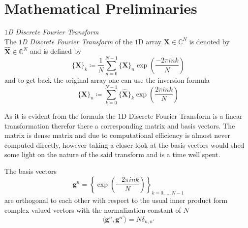 \chapter{Mathematical Preliminaries}






\begin{Def}\label{def:1ddft}
    \emph{$1$D Discrete Fourier Transform}\\
    The \emph{$1$D Discrete Fourier Transform} of the $1$D array $\boldsymbol{X} \in \mathbb{C}^{N}$ is denoted by 
    $\hat {\boldsymbol{X}} \in \mathbb{C}^{N}$ and is defined by
    \begin{equation}\label{eq:1ddft}
        \{\hat {\boldsymbol{X}}\}_{k} \coloneq \frac{1}{N}\sum_{n=0}^{N-1} \{{\boldsymbol{X}}\}_{n}\exp\left({\frac{-2\pi ink}{N}}\right)
    \end{equation}
    and to get back the original array one can use the inversion formula
    \begin{equation}\label{eq:1didft}
        \{{\boldsymbol{X}}\}_{n} \coloneq \sum_{k=0}^{N-1}\{\hat {\boldsymbol{X}}\}_{k}\exp\left({\frac{2\pi ink}{N}}\right)
    \end{equation}    
\end{Def}

As it is evident from the formula the $1$D Discrete Fourier Transform is a linear transformation therefor 
there a corresponding matrix and basis vectors. The matrix is dense matrix and due to computational efficiency 
is almost never computed directly, however taking a closer look at the basis vectors would shed some light on 
the nature of the said transform and is a time well spent.

\begin{Prop}\label{Prop:1ddftbasisvectors}
    The basis vectors
    \begin{equation}\label{eq:1ddftbasisvectors}
        \boldsymbol{g}^n = \left\{\exp\left({\frac{-2\pi ink}{N}}\right)\right\}_{k=0,\ldots,N-1}
    \end{equation}
    are orthogonal to each other with respect to the usual inner product form complex valued vectors 
    with the normalization constant of $N$
    \begin{equation}
        \langle\boldsymbol{g}^n,\boldsymbol{g}^{n'}\rangle= N \delta_{n,n'}
    \end{equation}
\end{Prop}

